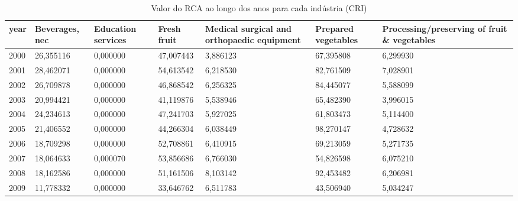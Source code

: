\begin{table}
\centering
\caption{Valor do RCA ao longo dos anos para cada indústria (CRI)}
\begin{tabular}{p{1cm}p{2cm}p{2cm}p{2cm}p{2cm}p{2cm}p{2cm}}
\toprule
 year &  Beverages, nec &  Education services &  Fresh fruit &  Medical surgical and orthopaedic equipment &  Prepared vegetables &  Processing/preserving of fruit \& vegetables \\
\midrule
 2000 &       26,355116 &            0,000000 &    47,007443 &                                    3,886123 &            67,395808 &                                     6,299930 \\
 2001 &       28,462071 &            0,000000 &    54,613542 &                                    6,218530 &            82,761509 &                                     7,028901 \\
 2002 &       26,709878 &            0,000000 &    46,868542 &                                    6,256325 &            84,445077 &                                     5,588099 \\
 2003 &       20,994421 &            0,000000 &    41,119876 &                                    5,538946 &            65,482390 &                                     3,996015 \\
 2004 &       24,234613 &            0,000000 &    47,241703 &                                    5,927025 &            61,803473 &                                     5,114400 \\
 2005 &       21,406552 &            0,000000 &    44,266304 &                                    6,038449 &            98,270147 &                                     4,728632 \\
 2006 &       18,709298 &            0,000000 &    52,708861 &                                    6,410915 &            69,213059 &                                     5,271735 \\
 2007 &       18,064633 &            0,000070 &    53,856686 &                                    6,766030 &            54,826598 &                                     6,075210 \\
 2008 &       18,162586 &            0,000000 &    51,161506 &                                    8,103142 &            92,453482 &                                     6,206981 \\
 2009 &       11,778332 &            0,000000 &    33,646762 &                                    6,511783 &            43,506940 &                                     5,034247 \\

\end{tabular}
\end{table}
